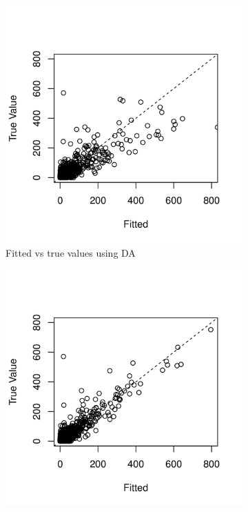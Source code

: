 \documentclass[10pt]{article}
\begin{document}
 \begin{figure}[H]
   \begin{subfigure}[b]{0.45\textwidth}
 \includegraphics[width=1\textwidth]{poisson_fitting_da.png}
 \caption{Fitted vs true values using DA}
 \end{subfigure}
  \hfill 
 \begin{subfigure}[b]{0.45\textwidth}
 \includegraphics[width=1\textwidth]{poisson_fitting_ada.png}

\end{subfigure}
\end{figure}
\end{document}
